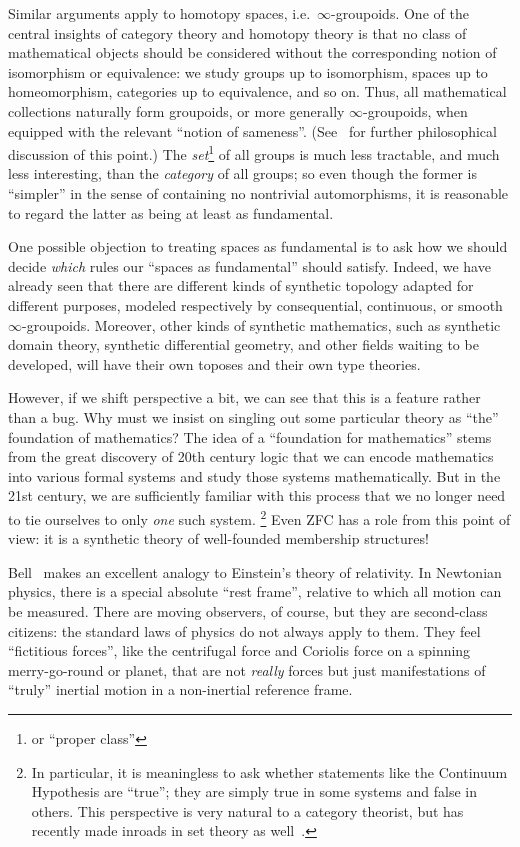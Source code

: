 \documentclass[10pt]{article}
\def\oo{\ensuremath{\infty}}
\numberwithin{equation}{section}
\begin{document}
Similar arguments apply to homotopy spaces, i.e.\ $\oo$-groupoids.
One of the central insights of category theory and homotopy theory is that no class of mathematical objects should be considered without the corresponding notion of isomorphism or equivalence:
we study groups up to isomorphism, spaces up to homeomorphism, categories up to equivalence, and so on.
Thus, all mathematical collections naturally form groupoids, or more generally $\oo$-groupoids, when equipped with the relevant ``notion of sameness''.
(See~\cite{shulman:synhott} for further philosophical discussion of this point.)
The \emph{set}\footnote{or ``proper class''} of all groups is much less tractable, and much less interesting, than the \emph{category} of all groups; so even though the former is ``simpler'' in the sense of containing no nontrivial automorphisms, it is reasonable to regard the latter as being at least as fundamental.

One possible objection to treating spaces as fundamental is to ask how we should decide \emph{which} rules our ``spaces as fundamental'' should satisfy.
Indeed, we have already seen that there are different kinds of synthetic topology adapted for different purposes, modeled respectively by consequential, continuous, or smooth \oo-groupoids.
Moreover, other kinds of synthetic mathematics, such as synthetic domain theory, synthetic differential geometry, and other fields waiting to be developed, will have their own toposes and their own type theories.

However, if we shift perspective a bit, we can see that this is a feature rather than a bug.
Why must we insist on singling out some particular theory as ``the'' foundation of mathematics?
The idea of a ``foundation for mathematics'' stems from the great discovery of 20th century logic that we can encode mathematics into various formal systems and study those systems mathematically.
But in the 21st century, we are sufficiently familiar with this process that we no longer need to tie ourselves to only \emph{one} such system.%
\footnote{In particular, it is meaningless to ask whether statements like the Continuum Hypothesis are ``true''; they are simply true in some systems and false in others.
This perspective is very natural to a category theorist, but has recently made inroads in set theory as well~\cite{hamkins:multiverse}.}
Even ZFC has a role from this point of view: it is a synthetic theory of well-founded membership structures!

Bell~\cite{bell:topos-lst} makes an excellent analogy to Einstein's theory of relativity.
In Newtonian physics, there is a special absolute ``rest frame'', relative to which all motion can be measured.
There are moving observers, of course, but they are second-class citizens: the standard laws of physics do not always apply to them.
They feel ``fictitious forces'', like the centrifugal force and Coriolis force on a spinning merry-go-round or planet, that are not \emph{really} forces but just manifestations of ``truly'' inertial motion in a non-inertial reference frame.
\end{document}
